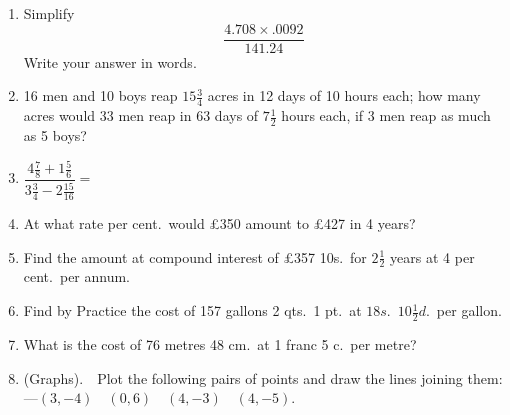 \documentclass[12pt]{article}
\begin{document}
\begin{enumerate}[leftmargin=1.5em, itemsep=10pt]

    \item Simplify
    \[
    \frac{4.708 \times .0092}{141.24}
    \]
    Write your answer in words.

    \item 16 men and 10 boys reap $15\frac{3}{4}$ acres in 12 days of 10 hours each; how many acres would 33 men reap in 63 days of $7\frac{1}{2}$ hours each, if 3 men reap as much as 5 boys?

    \item $\dfrac{4\frac{7}{8} + 1\frac{5}{6}}{3\frac{3}{4} - 2\frac{15}{16}} = $

    \item At what rate per cent.\ would \pounds350 amount to \pounds427 in 4 years?

    \item Find the amount at compound interest of \pounds357 10s.\ for $2\frac{1}{2}$ years at 4 per cent.\ per annum.

    \item Find by Practice the cost of 157 gallons 2 qts.\ 1 pt.\ at $18s$.\ $10\frac{1}{2}d$.\ per gallon.

    \item What is the cost of 76 metres 48 cm.\ at 1 franc 5 c.\ per metre?

    \item (Graphs).\ \ Plot the following pairs of points and draw the lines joining them:---$(3, -4)$\ \ $(0, 6)$\ \ $(4, -3)$\ \ $(4, -5)$.

\end{enumerate}
\end{document}
